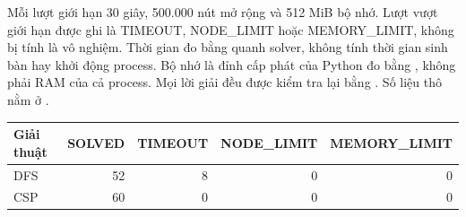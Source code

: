 Mỗi lượt giới hạn 30 giây, 500.000 nút mở rộng và 512 MiB bộ nhớ. Lượt vượt
giới hạn được ghi là TIMEOUT, NODE\_LIMIT hoặc MEMORY\_LIMIT, không bị tính là
vô nghiệm. Thời gian đo bằng  quanh solver, không tính thời
gian sinh bàn hay khởi động process. Bộ nhớ là đỉnh cấp phát của Python đo bằng
, không phải RAM của cả process. Mọi lời giải đều được kiểm tra
lại bằng . Số liệu thô nằm ở
.

\begin{center}\small
\begin{tabular}{@{}lrrrr@{}}
\toprule
Giải thuật & SOLVED & TIMEOUT & NODE\_LIMIT & MEMORY\_LIMIT\\
\midrule
DFS & 52 & 8 & 0 & 0\\
CSP & 60 & 0 & 0 & 0\\
\bottomrule
\end{tabular}
\end{center}
